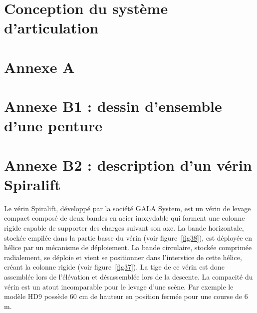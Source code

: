 

\section{Conception du système d'articulation}




\clearpage
\section*{Annexe A}


\clearpage
\section*{Annexe B1 : dessin d'ensemble d'une penture}


\clearpage
\section*{Annexe B2 : description d'un vérin Spiralift}

Le vérin Spiralift, développé par la société GALA System, est un vérin de levage compact composé de deux bandes en acier inoxydable qui forment une colonne rigide capable de supporter des charges suivant son axe. La bande horizontale, stockée empilée dans la partie basse du vérin (voir figure~\ref{fig38}), est déployée en hélice par un mécanisme de déploiement. La bande circulaire, stockée comprimée radialement, se déploie et vient se positionner dans l'interstice de cette hélice, créant la colonne rigide (voir figure~\ref{fig37}). La tige de ce vérin est donc assemblée lors de l'élévation et désassemblée lors de la descente. La compacité du vérin est un atout incomparable pour le levage d'une scène. Par exemple le modèle HD9 possède 60 cm de hauteur en position fermée pour une course de 6 m.

